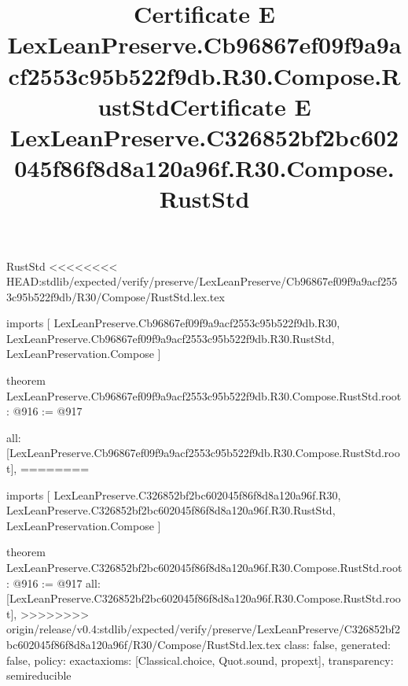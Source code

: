 \begin{lexlean}{RustStd}
<<<<<<<< HEAD:stdlib/expected/verify/preserve/LexLeanPreserve/Cb96867ef09f9a9acf2553c95b522f9db/R30/Compose/RustStd.lex.tex
\title{Certificate E LexLeanPreserve.Cb96867ef09f9a9acf2553c95b522f9db.R30.Compose.RustStd}
\begin{coremodule}
imports [
  LexLeanPreserve.Cb96867ef09f9a9acf2553c95b522f9db.R30,
  LexLeanPreserve.Cb96867ef09f9a9acf2553c95b522f9db.R30.RustStd,
  LexLeanPreservation.Compose
]

theorem LexLeanPreserve.Cb96867ef09f9a9acf2553c95b522f9db.R30.Compose.RustStd.root : @916 := @917 {
  all: [LexLeanPreserve.Cb96867ef09f9a9acf2553c95b522f9db.R30.Compose.RustStd.root],
========
\title{Certificate E LexLeanPreserve.C326852bf2bc602045f86f8d8a120a96f.R30.Compose.RustStd}
\begin{coremodule}
imports [
  LexLeanPreserve.C326852bf2bc602045f86f8d8a120a96f.R30,
  LexLeanPreserve.C326852bf2bc602045f86f8d8a120a96f.R30.RustStd,
  LexLeanPreservation.Compose
]

theorem LexLeanPreserve.C326852bf2bc602045f86f8d8a120a96f.R30.Compose.RustStd.root : @916 := @917 {
  all: [LexLeanPreserve.C326852bf2bc602045f86f8d8a120a96f.R30.Compose.RustStd.root],
>>>>>>>> origin/release/v0.4:stdlib/expected/verify/preserve/LexLeanPreserve/C326852bf2bc602045f86f8d8a120a96f/R30/Compose/RustStd.lex.tex
  class: false,
  generated: false,
  policy: exact{axioms: [Classical.choice, Quot.sound, propext]},
  transparency: semireducible
}


\end{coremodule}}
\end{coremodule}
\end{lexlean}
